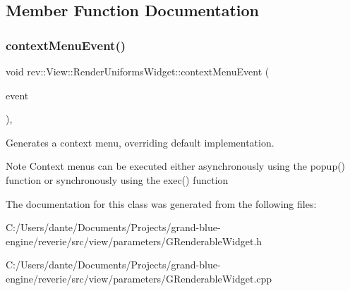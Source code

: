 \subsection{Member Function Documentation}
\mbox{\label{classrev_1_1_view_1_1_render_uniforms_widget_aeafad1935f40c7fdf095c6598fc0f49c}} 
\subsubsection{\texorpdfstring{contextMenuEvent()}{contextMenuEvent()}}
{\footnotesize\ttfamily void rev\+::\+View\+::\+Render\+Uniforms\+Widget\+::context\+Menu\+Event (\begin{DoxyParamCaption}\item[{Q\+Context\+Menu\+Event $\ast$}]{event }\end{DoxyParamCaption})\hspace{0.3cm}{\ttfamily [override]}, {\ttfamily [protected]}}



Generates a context menu, overriding default implementation. 

\begin{DoxyNote}{Note}
Context menus can be executed either asynchronously using the popup() function or synchronously using the exec() function 
\end{DoxyNote}


The documentation for this class was generated from the following files\+:\begin{DoxyCompactItemize}
\item 
C\+:/\+Users/dante/\+Documents/\+Projects/grand-\/blue-\/engine/reverie/src/view/parameters/G\+Renderable\+Widget.\+h\item 
C\+:/\+Users/dante/\+Documents/\+Projects/grand-\/blue-\/engine/reverie/src/view/parameters/G\+Renderable\+Widget.\+cpp\end{DoxyCompactItemize}
